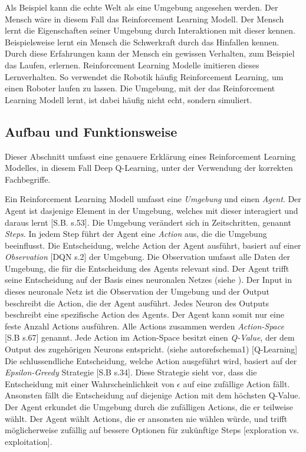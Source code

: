 Als Beispiel kann die echte Welt als eine Umgebung angesehen werden. Der Mensch
wäre in diesem Fall das Reinforcement Learning Modell. Der Mensch lernt die
Eigenschaften seiner Umgebung durch Interaktionen mit dieser kennen.
Beispielsweise lernt ein Mensch die Schwerkraft durch das Hinfallen kennen.
Durch diese Erfahrungen kann der Mensch ein gewissen Verhalten, zum Beispiel das
Laufen, erlernen. Reinforcement Learning Modelle imitieren dieses Lernverhalten.
So verwendet die Robotik häufig Reinforcement Learning, um einen Roboter laufen
zu lassen. Die Umgebung, mit der das Reinforcement Learning Modell lernt, ist
dabei häufig nicht echt, sondern simuliert.

\subsection{Aufbau und Funktionsweise}\label{sub:t_rl_func}
Dieser Abschnitt umfasst eine genauere Erklärung eines Reinforcement Learning
Modelles, in diesem Fall Deep Q-Learning, unter der Verwendung der korrekten
Fachbegriffe.

Ein Reinforcement Learning Modell umfasst eine \emph{Umgebung} und einen
\emph{Agent}. Der Agent ist dasjenige Element in der Umgebung, welches mit
dieser interagiert und daraus lernt [S.B. s.53]. Die Umgebung verändert sich in
Zeitschritten, genannt \emph{Steps}. In jedem Step führt der Agent eine
\emph{Action} aus, die die Umgebung beeinflusst. Die Entscheidung, welche Action
der Agent ausführt, basiert auf einer \emph{Observation} [DQN s.2] der Umgebung.
Die Observation umfasst alle Daten der Umgebung, die für die Entscheidung des
Agents relevant sind. Der Agent trifft seine Entscheidung auf der Basis eines
neuronalen Netzes (siehe ). Der Input in dieses neuronale
Netz ist die Observation der Umgebung und der Output beschreibt die Action, die
der Agent ausführt. Jedes Neuron des Outputs beschreibt eine spezifische Action
des Agents. Der Agent kann somit nur eine feste Anzahl Actions ausführen. Alle
Actions zusammen werden \emph{Action-Space} [S.B s.67] genannt. Jede Action im
Action-Space besitzt einen \emph{Q-Value}, der dem Output des zugehörigen
Neurons entspricht. (siehe autoref{schema1}) [Q-Learning] Die schlussendliche
Entscheidung, welche Action ausgeführt wird, basiert auf der
\emph{Epsilon-Greedy} Strategie [S.B s.34]. Diese Strategie sieht vor, dass die
Entscheidung mit einer Wahrscheinlichkeit von $\epsilon$ auf eine zufällige
Action fällt. Ansonsten fällt die Entscheidung auf diejenige Action mit dem
höchsten Q-Value. Der Agent erkundet die Umgebung durch die zufälligen Actions,
die er teilweise wählt. Der Agent wählt Actions, die er ansonsten nie wählen
würde, und trifft möglicherweise zufällig auf bessere Optionen für zukünftige
Steps [exploration vs. exploitation]. 

